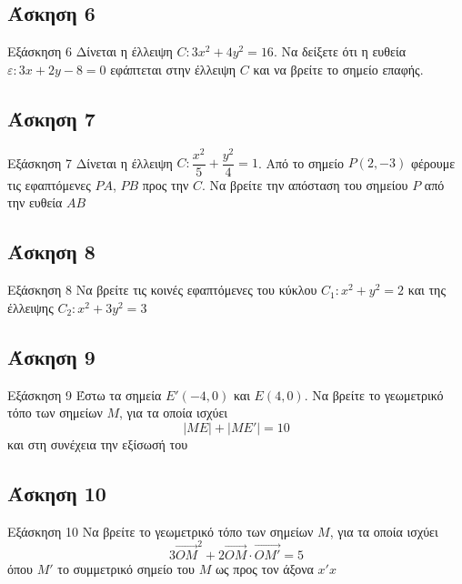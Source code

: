 \documentclass[greek]{beamer}
\begin{document}
\subsection{Άσκηση 6}
\begin{frame}[label=Άσκηση6,t]{Εξάσκηση 6}
 Δίνεται η έλλειψη $C:3x^2+4y^2=16$. Να δείξετε ότι η ευθεία $ε:3x+2y-8=0$ εφάπτεται στην έλλειψη $C$ και να βρείτε το σημείο επαφής.

\end{frame}

\subsection{Άσκηση 7}
\begin{frame}[label=Άσκηση7,t]{Εξάσκηση 7}
 Δίνεται η έλλειψη $C:\dfrac{x^2}{5}+\dfrac{y^2}{4}=1$. Από το σημείο $Ρ(2,-3)$ φέρουμε τις εφαπτόμενες $ΡΑ$, $ΡΒ$ προς την $C$. Να βρείτε την απόσταση του σημείου $Ρ$ από την ευθεία $ΑΒ$

\end{frame}

\subsection{Άσκηση 8}
\begin{frame}[label=Άσκηση8,t]{Εξάσκηση 8}
 Να βρείτε τις κοινές εφαπτόμενες του κύκλου $C_1:x^2+y^2=2$ και της έλλειψης $C_2:x^2+3y^2=3$

\end{frame}

\subsection{Άσκηση 9}
\begin{frame}[label=Άσκηση9,t]{Εξάσκηση 9}
 Έστω τα σημεία $Ε'(-4,0)$ και $Ε(4,0)$. Να βρείτε το γεωμετρικό τόπο των σημείων $Μ$, για τα οποία ισχύει
 $$|ΜΕ|+|ΜΕ'|=10$$
 και στη συνέχεια την εξίσωσή του

\end{frame}

\subsection{Άσκηση 10}
\begin{frame}[label=Άσκηση10,t]{Εξάσκηση 10}
  Να βρείτε το γεωμετρικό τόπο των σημείων $Μ$, για τα οποία ισχύει
  $$3\overrightarrow{OM}^2+2\overrightarrow{OM}\cdot \overrightarrow{OM'}=5$$
  όπου $M'$ το συμμετρικό σημείο του $M$ ως προς τον άξονα $x'x$

\end{frame}
\end{document}
